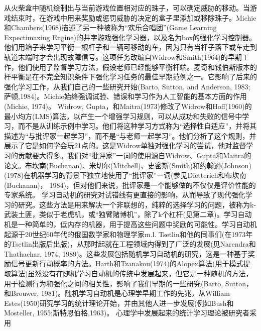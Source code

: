 从火柴盒中随机绘制出与当前游戏位置相对应的珠子，可以确定威胁的移动。当游戏结束时，在游戏中用来奖励或惩罚威胁的决定的盒子里添加或移除珠子。Michie和Chambers(1968)描述了另一种被称为“欢乐合唱团”(Game Learning Expectimaxing Engine)的井字游戏强化学习器，以及名为box的强化学习控制器。他们用箱子来学习平衡一根杆子和一辆可移动的车，因为只有当杆子落下或车走到轨道末端时才会出现故障信号。这项任务改编自Widrow和Smith(1964)的早期工作，他们使用了监督学习方法，假设老师已经能够平衡杆端。麦奇和钱伯斯版本的杆平衡是在不完全知识条件下强化学习任务的最佳早期范例之一。它影响了后来的强化学习工作，从我们自己的一些研究开始(Barto, Sutton, and Anderson, 1983;萨顿,1984)。Michie始终强调试验、错误和学习作为人工智能的基本方面的作用(Michie, 1974)。
Widrow, Gupta，和Maitra(1973)修改了Widrow和Hoff(1960)的最小均方(LMS)算法，以产生一个增强学习规则，可以从成功和失败的信号中学习，而不是从训练示例中学习。他们将这种学习方式称为“选择性自适应”，并将其描述为“与批评家一起学习”，而不是“与老师一起学习”。他们分析了这个规则，并展示了它是如何学会玩21点的。这是Widrow单独对强化学习的尝试，他对监督学习的贡献要大得多。我们对“批评家”一词的使用源自Widrow、Gupta和Maitra的论文。布坎南(Buchanan)、米切尔(Mitchell)、史密斯(Smith)和约翰逊(Johnson)(1978)在机器学习的背景下独立地使用了“批评家”一词(参见Dietterich和布坎南(Buchanan)， 1984)，但对他们来说，批评家是一个能够做的不仅仅是评价性能的专家系统。
学习自动机的研究对试错线有更直接的影响，从而导致了现代强化学习的研究。这些方法是用来解决一个非联想的，纯粹的选择学习的问题，被称为k-武装土匪，类似于老虎机，或“独臂赌博机”，除了k个杠杆(见第二章)。学习自动机是一种简单的，低内存的机器，用于提高这些问题中奖励的可能性。学习自动机起源于20世纪60年代的俄国数学家和物理学家m.l. Tsetlin和他的同事们(在1973年的Tsetlin出版后出版)，从那时起就在工程领域内得到了广泛的发展(见Narendra和Thathachar, 1974, 1989)。这些发展包括随机学习自动机的研究，这是一种基于奖励信号更新行动概率的方法。Harth和Tzanakou(1974)的Alopex算法(用于模式提取算法)虽然没有在随机学习自动机的传统中发展起来，但它是一种随机的方法，用于检测行为和强化之间的相关性，影响了我们早期的一些研究(Barto, Sutton，和Brouwer, 1981)。随机学习自动机是心理学早期工作的先兆，从William Estes(1950)研究学习的统计理论开始，并由其他人进一步发展(例如Bush和Mosteller, 1955;斯特恩伯格,1963)。
心理学中发展起来的统计学习理论被研究者采用

